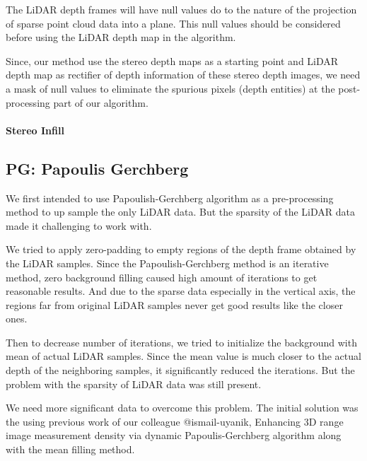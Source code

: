 \documentclass[conference]{IEEEtran}
\begin{document}
The LiDAR depth frames will have null values do to the nature of the projection of sparse point cloud data into a plane. This null values should be considered before using the LiDAR depth map in the algorithm.

Since, our method use the stereo depth maps as a starting point and LiDAR depth map as rectifier of depth information of these stereo depth images, we need a mask of null values to eliminate the spurious pixels (depth entities) at the post-processing part of our algorithm.

\paragraph{Stereo Infill}

\subsection{PG: Papoulis Gerchberg}
We first intended to use Papoulish-Gerchberg algorithm as a pre-processing method to up sample the only LiDAR data. But the sparsity of the LiDAR data made it challenging to work with.

We tried to apply zero-padding to empty regions of the depth frame obtained by the LiDAR samples. Since the Papoulish-Gerchberg method is an iterative method, zero background filling caused high amount of iterations to get reasonable results. And due to the sparse data especially in the vertical axis, the regions far from original LiDAR samples never get good results like the closer ones.

Then to decrease number of iterations, we tried to initialize the background with mean of actual LiDAR samples. Since the mean value is much closer to the actual depth of the neighboring samples, it significantly reduced the iterations. But the problem with the sparsity of LiDAR data was still present.

We need more significant data to overcome this problem. The initial solution was the using previous work of our colleague @ismail-uyanik, {Enhancing 3D range image measurement density via dynamic Papoulis-Gerchberg algorithm} along with the mean filling method.
\end{document}

